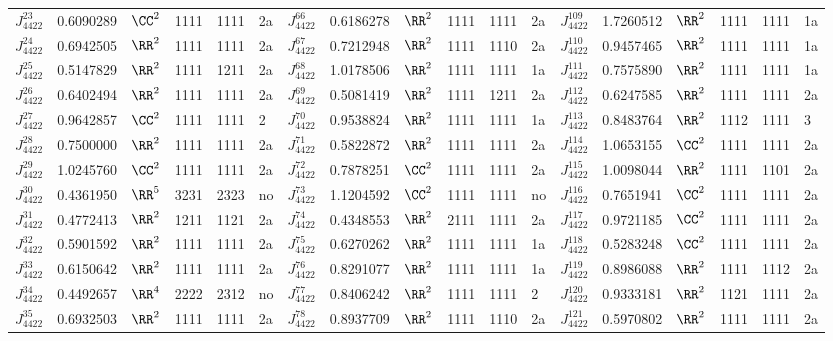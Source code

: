 \begin{table}[p]
\begin{tabular}{l l l l l l l l l l l l l l l l l l}
 $J^{23}_{4422}$&0.6090289&$\CC^2$&1111&1111&2a&\hphantom{v}$J^{66}_{4422}$&0.6186278&$\RR^2$&1111&1111&2a&\hphantom{v}$J^{109}_{4422}$&1.7260512&$\RR^2$&1111&1111&1a\\
 $J^{24}_{4422}$&0.6942505&$\RR^2$&1111&1111&2a&\hphantom{v}$J^{67}_{4422}$&0.7212948&$\RR^2$&1111&1110&2a&\hphantom{v}$J^{110}_{4422}$&0.9457465&$\RR^2$&1111&1111&1a\\
 $J^{25}_{4422}$&0.5147829&$\RR^2$&1111&1211&2a&\hphantom{v}$J^{68}_{4422}$&1.0178506&$\RR^2$&1111&1111&1a&\hphantom{v}$J^{111}_{4422}$&0.7575890&$\RR^2$&1111&1111&1a\\
 $J^{26}_{4422}$&0.6402494&$\RR^2$&1111&1111&2a&\hphantom{v}$J^{69}_{4422}$&0.5081419&$\RR^2$&1111&1211&2a&\hphantom{v}$J^{112}_{4422}$&0.6247585&$\RR^2$&1111&1111&2a\\
 $J^{27}_{4422}$&0.9642857&$\CC^2$&1111&1111&2&\hphantom{v}$J^{70}_{4422}$&0.9538824&$\RR^2$&1111&1111&1a&\hphantom{v}$J^{113}_{4422}$&0.8483764&$\RR^2$&1112&1111&3\\
 $J^{28}_{4422}$&0.7500000&$\RR^2$&1111&1111&2a&\hphantom{v}$J^{71}_{4422}$&0.5822872&$\RR^2$&1111&1111&2a&\hphantom{v}$J^{114}_{4422}$&1.0653155&$\CC^2$&1111&1111&2a\\
 $J^{29}_{4422}$&1.0245760&$\CC^2$&1111&1111&2a&\hphantom{v}$J^{72}_{4422}$&0.7878251&$\CC^2$&1111&1111&2a&\hphantom{v}$J^{115}_{4422}$&1.0098044&$\RR^2$&1111&1101&2a\\
 $J^{30}_{4422}$&0.4361950&$\RR^5$&3231&2323&no&\hphantom{v}$J^{73}_{4422}$&1.1204592&$\CC^2$&1111&1111&no&\hphantom{v}$J^{116}_{4422}$&0.7651941&$\CC^2$&1111&1111&2a\\
 $J^{31}_{4422}$&0.4772413&$\RR^2$&1211&1121&2a&\hphantom{v}$J^{74}_{4422}$&0.4348553&$\RR^2$&2111&1111&2a&\hphantom{v}$J^{117}_{4422}$&0.9721185&$\CC^2$&1111&1111&2a\\
 $J^{32}_{4422}$&0.5901592&$\RR^2$&1111&1111&2a&\hphantom{v}$J^{75}_{4422}$&0.6270262&$\RR^2$&1111&1111&1a&\hphantom{v}$J^{118}_{4422}$&0.5283248&$\CC^2$&1111&1111&2a\\
 $J^{33}_{4422}$&0.6150642&$\RR^2$&1111&1111&2a&\hphantom{v}$J^{76}_{4422}$&0.8291077&$\RR^2$&1111&1111&1a&\hphantom{v}$J^{119}_{4422}$&0.8986088&$\RR^2$&1111&1112&2a\\
 $J^{34}_{4422}$&0.4492657&$\RR^4$&2222&2312&no&\hphantom{v}$J^{77}_{4422}$&0.8406242&$\RR^2$&1111&1111&2&\hphantom{v}$J^{120}_{4422}$&0.9333181&$\RR^2$&1121&1111&2a\\
 $J^{35}_{4422}$&0.6932503&$\RR^2$&1111&1111&2a&\hphantom{v}$J^{78}_{4422}$&0.8937709&$\RR^2$&1111&1110&2a&\hphantom{v}$J^{121}_{4422}$&0.5970802&$\RR^2$&1111&1111&2a\\

\end{tabular}
\end{table}
